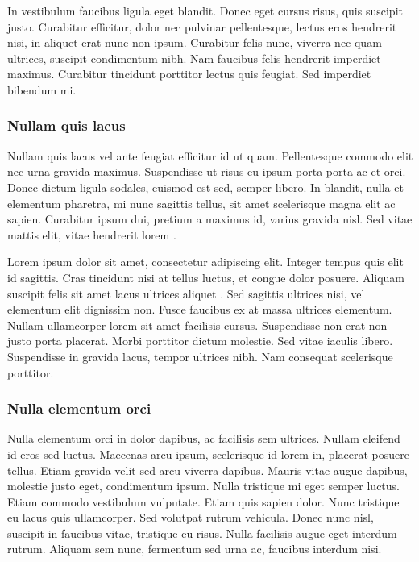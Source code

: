 In vestibulum faucibus ligula eget blandit. Donec eget cursus risus, quis suscipit justo. Curabitur efficitur, dolor nec pulvinar pellentesque, lectus eros hendrerit nisi, in aliquet erat nunc non ipsum. Curabitur felis nunc, viverra nec quam ultrices, suscipit condimentum nibh. Nam faucibus felis hendrerit imperdiet maximus. Curabitur tincidunt porttitor lectus quis feugiat. Sed imperdiet bibendum mi.


\subsubsection{Nullam quis lacus}

Nullam quis lacus vel ante feugiat efficitur id ut quam. Pellentesque commodo elit nec urna gravida maximus. Suspendisse ut risus eu ipsum porta porta ac et orci. Donec dictum ligula sodales, euismod est sed, semper libero. In blandit, nulla et elementum pharetra, mi nunc sagittis tellus, sit amet scelerisque magna elit ac sapien. Curabitur ipsum dui, pretium a maximus id, varius gravida nisl. Sed vitae mattis elit, vitae hendrerit lorem \cite{lora-hw-e539v03a}. 

Lorem ipsum dolor sit amet, consectetur adipiscing elit. Integer tempus quis elit id sagittis. Cras tincidunt nisi at tellus luctus, et congue dolor posuere. Aliquam suscipit felis sit amet lacus ultrices aliquet \cite{gitlab_satnogs}. Sed sagittis ultrices nisi, vel elementum elit dignissim non. Fusce faucibus ex at massa ultrices elementum. Nullam ullamcorper lorem sit amet facilisis cursus. Suspendisse non erat non justo porta placerat. Morbi porttitor dictum molestie. Sed vitae iaculis libero. Suspendisse in gravida lacus, tempor ultrices nibh. Nam consequat scelerisque porttitor. 

\subsubsection{Nulla elementum orci}

Nulla elementum orci in dolor dapibus, ac facilisis sem ultrices. Nullam eleifend id eros sed luctus. Maecenas arcu ipsum, scelerisque id lorem in, placerat posuere tellus. Etiam gravida velit sed arcu viverra dapibus. Mauris vitae augue dapibus, molestie justo eget, condimentum ipsum. Nulla tristique mi eget semper luctus. Etiam commodo vestibulum vulputate. Etiam quis sapien dolor. Nunc tristique eu lacus quis ullamcorper. Sed volutpat rutrum vehicula. Donec nunc nisl, suscipit in faucibus vitae, tristique eu risus. Nulla facilisis augue eget interdum rutrum. Aliquam sem nunc, fermentum sed urna ac, faucibus interdum nisi.

